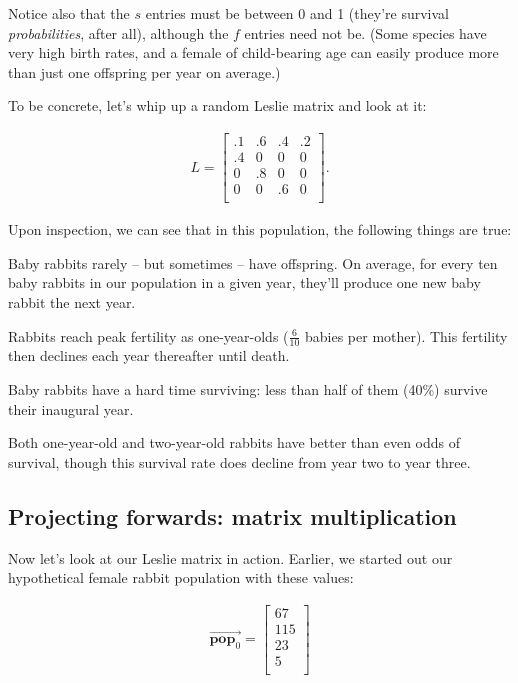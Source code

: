 Notice also that the $s$ entries must be between 0 and 1 (they're survival
\textit{probabilities}, after all), although the $f$ entries need not be. (Some
species have very high birth rates, and a female of child-bearing age can
easily produce more than just one offspring per year on average.)

To be concrete, let's whip up a random Leslie matrix and look at it:

\vspace{-.15in}
\begin{align*}
L =
\begin{bmatrix}
.1 & .6 & .4 & .2 \\
.4 & 0 & 0 & 0 \\
0 & .8 & 0 & 0 \\
0 & 0 & .6 & 0 \\
\end{bmatrix}.
\end{align*}
\vspace{-.15in}

Upon inspection, we can see that in this population, the following things are
true:

\begin{compactitem}
\item Baby rabbits rarely -- but sometimes -- have offspring. On average, for
every ten baby rabbits in our population in a given year, they'll produce one
new baby rabbit the next year.
\item Rabbits reach peak fertility as one-year-olds ($\frac{6}{10}$ babies per
mother). This fertility then declines each year thereafter until death.
\item Baby rabbits have a hard time surviving: less than half of them (40\%)
survive their inaugural year.
\item Both one-year-old and two-year-old rabbits have better than even odds of
survival, though this survival rate does decline from year two to year three.
\end{compactitem}


\subsection{Projecting forwards: matrix multiplication}

Now let's look at our Leslie matrix in action. Earlier, we started out our
hypothetical female rabbit population with these values:

\vspace{-.15in}
\begin{align*}
\overrightarrow{\textbf{pop}_0} =
\begin{bmatrix}
67 \\ 115 \\ 23 \\ 5 \\
\end{bmatrix}
\end{align*}
\vspace{-.15in}

